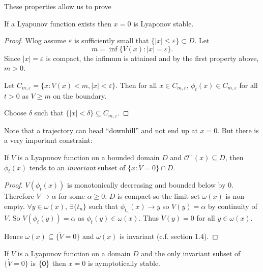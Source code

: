 \documentclass[a4paper]{article}
\begin{document}
These properties allow us to prove

\begin{thm}
  If a Lyapunov function exists then \(x=0\) is Lyaponov stable.
\end{thm}

\begin{proof}
  Wlog assume \(\varepsilon\) is sufficiently small that \(\{|x|\leq\varepsilon\} \subset D\). Let
  \[
    m = \inf \{V(x): |x| = \varepsilon\}.
  \]
  Since \(|x|=\varepsilon\) is compact, the infimum is attained and by the first property above, \(m>0\).

  Let \(C_{m,\varepsilon} = \{x: V(x)<m, |x| < \varepsilon \}\). Then for all \(x\in C_{m,\varepsilon}\), \(\phi_t(x) \in C_{m,\varepsilon}\) for all \(t>0\) as \(V\geq m\) on the boundary.

  Choose \(\delta\) such that \(\{|x|< \delta\} \subseteq C_{m,\varepsilon}\).
\end{proof}

Note that a trajectory can head ``downhill'' and not end up at \(x=0\). But there is a very important constraint:

\begin{thm}
  If \(V\) is a Lyapunov function on a bounded domain \(D\) and \(\mathcal O^+(x) \subseteq D\), then \(\phi_t(x)\) tends to an \emph{invariant} subset of \(\{x: \dot{V} = 0\} \cap D\).
\end{thm}

\begin{proof}
  \(V(\phi_t(x))\) is monotonically decreasing and bounded below by \(0\). Therefore \(V\to \alpha\) for some \(\alpha\geq0\). \(D\) is compact so the limit set \(\omega(x)\) is non-empty. \(\forall y\in \omega(x)\), \(\exists\{t_n\}\) such that \(\phi_{t_n}(x)\to y\) so \(V(y) = \alpha\) by continuity of \(V\). So \(V(\phi_t(y))=\alpha\) as \(\phi_t(y)\in \omega(x)\). Thus \(\dot{V}(y) = 0\) for all \(y\in\omega(x)\).

  Hence \(\omega(x) \subseteq \{ \dot{V} = 0\}\) and \(\omega(x)\) is invariant (c.f. section 1.4).
\end{proof}

\begin{cor}
  If \(V\) is a Lyapunov function on a domain \(D\) and the only invariant subset of \(\{\dot{V}=0\}\) is \(\{\mathbf{0}\}\) then \(x=0\) is aymptotically stable.
\end{cor}
\end{document}
